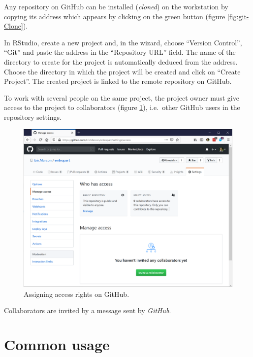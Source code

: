 \documentclass[
  12pt,
  american,
  a4paper,
  extrafontsizes,onecolumn,openright
  ]{memoir}
\begin{document}
\normalsize

Any repository on GitHub can be installed (\emph{cloned}) on the workstation by copying its address which appears by clicking on the green button (figure \ref{fig:git-Clone}).

In RStudio, create a new project and, in the wizard, choose \enquote{Version Control}, \enquote{Git} and paste the address in the \enquote{Repository URL} field.
The name of the directory to create for the project is automatically deduced from the address.
Choose the directory in which the project will be created and click on \enquote{Create Project}.
The created project is linked to the remote repository on GitHub.

To work with several people on the same project, the project owner must give access to the project to collaborators (figure \ref{fig:git-Access}), i.e.~other GitHub users in the repository settings.



\scriptsize

\begin{figure}

{\centering \includegraphics[width=0.8\linewidth]{images/git-Access} 

}

\caption{Assigning access rights on GitHub.}\label{fig:git-Access}
\end{figure}

\normalsize

Collaborators are invited by a message sent by \emph{GitHub}.

\section{Common usage}\label{common-usage}
\end{document}
